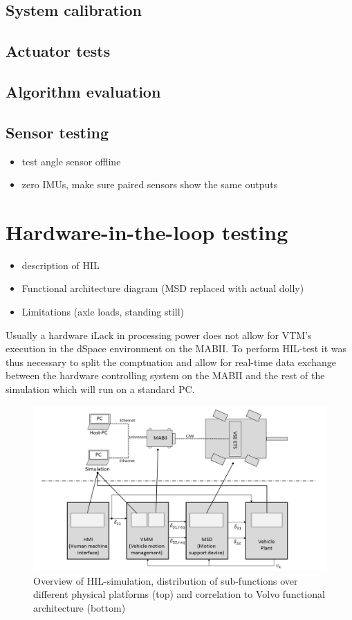 \documentclass[ExampleMasters.tex]{subfiles}
\begin{document}
\subsection{System calibration}
\subsection{Actuator tests}
\subsection{Algorithm evaluation}
\subsection{Sensor testing}

\begin{itemize}
	\item test angle sensor offline
	\item zero IMUs, make sure paired sensors show the same outputs
	
\end{itemize}

\section{Hardware-in-the-loop testing}
\begin{itemize}
	\item description of HIL
	\item Functional architecture diagram (MSD replaced with actual dolly)
	\item Limitations (axle loads, standing still)
\end{itemize}

Usually a hardware iLack in processing power does not allow for VTM's execution in the dSpace environment on the MABII. To perform HIL-test it was thus necessary to split the comptuation and allow for real-time data exchange between the hardware controlling system on the MABII and the rest of the simulation which will run on a standard PC. 

\begin{figure}[h]
\centering
\includegraphics[width=1\linewidth]{figures/HIL_overview}
\caption{Overview of HIL-simulation, distribution of sub-functions over different physical platforms (top) and correlation to Volvo functional architecture (bottom)}

\label{fig:HIL_overview}
\end{figure}
\end{document}
